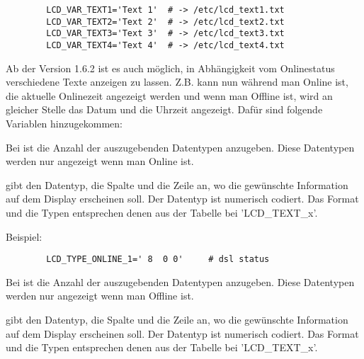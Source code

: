 \begin{description}
\begin{example}
\begin{verbatim}
        LCD_VAR_TEXT1='Text 1'  # -> /etc/lcd_text1.txt
        LCD_VAR_TEXT2='Text 2'  # -> /etc/lcd_text2.txt
        LCD_VAR_TEXT3='Text 3'  # -> /etc/lcd_text3.txt
        LCD_VAR_TEXT4='Text 4'  # -> /etc/lcd_text4.txt
\end{verbatim}
\end{example}

    Ab der Version 1.6.2 ist es auch möglich, in Abhängigkeit vom Onlinestatus
    verschiedene Texte anzeigen zu lassen. Z.B. kann nun während man Online
    ist, die aktuelle Onlinezeit angezeigt werden und wenn man Offline ist,
    wird an gleicher Stelle das Datum und die Uhrzeit angezeigt.
    Dafür sind folgende Variablen hinzugekommen:


      Bei  ist die Anzahl der auszugebenden Datentypen
      anzugeben. Diese Datentypen werden nur angezeigt wenn man Online ist.



       gibt den Datentyp, die Spalte und die Zeile an,
      wo die gewünschte Information auf dem Display erscheinen soll. Der
      Datentyp ist numerisch codiert.
      Das Format und die Typen entsprechen denen aus der Tabelle bei
      'LCD\_TEXT\_x'.

      Beispiel:
\begin{example}
\begin{verbatim}
        LCD_TYPE_ONLINE_1=' 8  0 0'     # dsl status
\end{verbatim}
\end{example}



      Bei  ist die Anzahl der auszugebenden Datentypen
      anzugeben. Diese Datentypen werden nur angezeigt wenn man Offline ist.



         gibt den Datentyp, die Spalte und die Zeile an,
        wo die gewünschte Information auf dem Display erscheinen soll. Der
        Datentyp ist numerisch codiert.
        Das Format und die Typen entsprechen denen aus der Tabelle bei
        'LCD\_TEXT\_x'.


\end{description}
